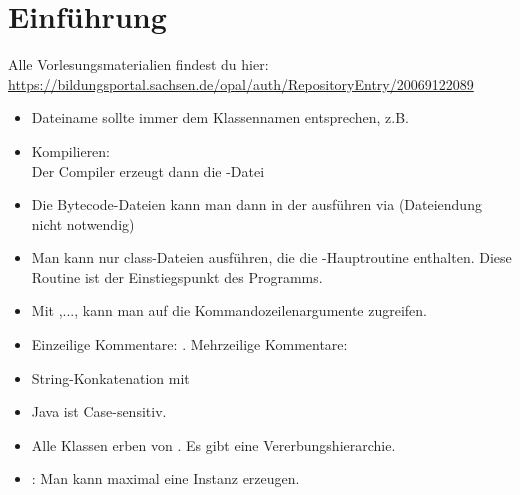 
\chapter{Einführung}
Alle Vorlesungsmaterialien findest du hier:\\
\url{https://bildungsportal.sachsen.de/opal/auth/RepositoryEntry/20069122089}

\begin{itemize}
	\item Dateiname sollte immer dem Klassennamen entsprechen, z.B. 
	\item Kompilieren: \\
	Der Compiler erzeugt dann die -Datei 
	\item Die Bytecode-Dateien kann man dann in der  ausführen via  (Dateiendung nicht notwendig)
	\item Man kann nur class-Dateien ausführen, die die -Hauptroutine enthalten.
	Diese Routine ist der Einstiegspunkt des Programms.
	\item Mit ,..., kann man auf die Kommandozeilenargumente zugreifen.
	\item Einzeilige Kommentare: . Mehrzeilige Kommentare: \code{/*$\ldots$*/}
	\item String-Konkatenation mit \code{+}
	\item Java ist Case-sensitiv.
	\item Alle Klassen erben von . 
	Es gibt eine Vererbungshierarchie.
	\item {}: Man kann maximal eine Instanz erzeugen.
\end{itemize}

